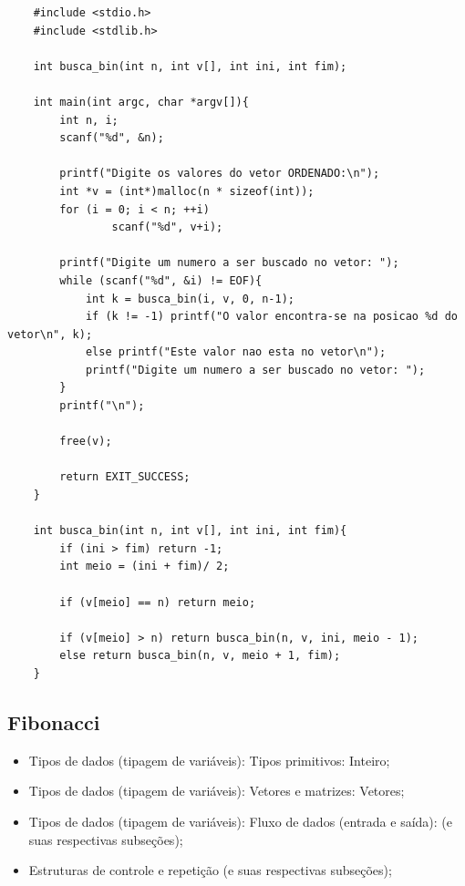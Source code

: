 \documentclass[12pt]{article}
\begin{document}
\hspace{0.25cm}
\begin{lstlisting}
    #include <stdio.h>
    #include <stdlib.h>
    
    int busca_bin(int n, int v[], int ini, int fim);
    
    int main(int argc, char *argv[]){
        int n, i;
        scanf("%d", &n);
        
    	printf("Digite os valores do vetor ORDENADO:\n");
        int *v = (int*)malloc(n * sizeof(int));
        for (i = 0; i < n; ++i)
                scanf("%d", v+i);
        
    	printf("Digite um numero a ser buscado no vetor: ");
        while (scanf("%d", &i) != EOF){
    		int k = busca_bin(i, v, 0, n-1);
    		if (k != -1) printf("O valor encontra-se na posicao %d do vetor\n", k);
    		else printf("Este valor nao esta no vetor\n");
    		printf("Digite um numero a ser buscado no vetor: ");
    	}
    	printf("\n");
        
        free(v);
        
        return EXIT_SUCCESS;
    }
    
    int busca_bin(int n, int v[], int ini, int fim){
    	if (ini > fim) return -1;
    	int meio = (ini + fim)/ 2;
    	
    	if (v[meio] == n) return meio;
    	
    	if (v[meio] > n) return busca_bin(n, v, ini, meio - 1);
    	else return busca_bin(n, v, meio + 1, fim);
    }
\end{lstlisting}

\newpage
\subsection{Fibonacci}

\hspace{0.25cm}
\begin{tcolorbox}[colback=violet!5!white,colframe=violet!75!white,title=Capítulos recomendados:]
    \begin{itemize}
        \item Tipos de dados (tipagem de variáveis): Tipos primitivos: Inteiro;
        \item Tipos de dados (tipagem de variáveis): Vetores e matrizes: Vetores;
        \item Tipos de dados (tipagem de variáveis): Fluxo de dados (entrada e saída): (e suas respectivas subseções);
        \item Estruturas de controle e repetição (e suas respectivas subseções);
    \end{itemize}
\end{tcolorbox}
\end{document}
